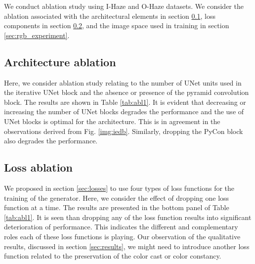 \documentclass[runningheads]{llncs}
\begin{document}
We conduct ablation study using I-Haze and O-Haze datasets. We consider the ablation associated with the architectural elements in section \ref{sec:unet_experiment}, loss components in section \ref{sec:losses_experiment}, and the image space used in training in section \ref{sec:rgb_experiment}. 

\subsection{Architecture ablation} \label{sec:unet_experiment}

Here, we consider ablation study relating to the number of UNet units used in the iterative UNet block and the absence or presence of the pyramid convolution block. The results are shown in Table \ref{tab:abl1}. It is evident that decreasing or increasing the number of UNet blocks degrades the performance and the use of  UNet blocks is optimal for the architecture. This is in agreement in the observations derived from Fig. \ref{img:iedb}. Similarly, dropping the PyCon block also degrades the performance. 

\subsection{Loss ablation} \label{sec:losses_experiment}
We proposed in section \ref{sec:losses} to use four types of loss functions for the training of the generator. Here, we consider the effect of dropping one loss function at a time. The results are presented in the bottom panel of Table \ref{tab:abl1}. It is seen than dropping any of the loss function results into significant deterioration of performance. This indicates the different and complementary roles each of these loss functions is playing. Our observation of the qualitative results, discussed in section \ref{sec:results}, we might need to introduce another loss function related to the preservation of the color cast or color constancy.
\end{document}
